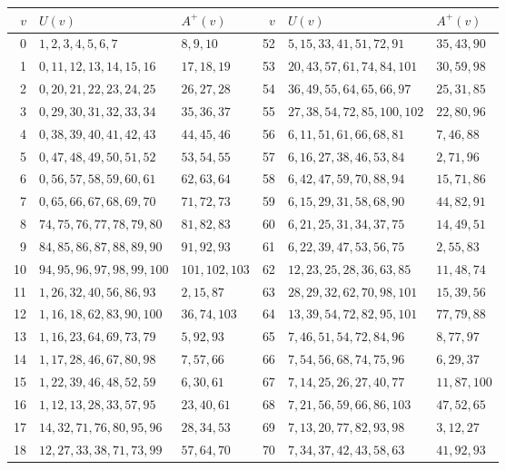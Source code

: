 \documentclass[11pt]{amsart}
\theoremstyle{remark}
\begin{document}
\begin{center}
\fontsize{6.8}{7.15}\selectfont
\setlength{\tabcolsep}{3.2pt}
\renewcommand{\arraystretch}{0.96}
\begin{tabular}{rll@{\quad}rll}
\toprule
$v$ & $U(v)$ & $A^+(v)$ & $v$ & $U(v)$ & $A^+(v)$ \\
\midrule
0 & $1,2,3,4,5,6,7$ & $8,9,10$ & 52 & $5,15,33,41,51,72,91$ & $35,43,90$ \\
1 & $0,11,12,13,14,15,16$ & $17,18,19$ & 53 & $20,43,57,61,74,84,101$ & $30,59,98$ \\
2 & $0,20,21,22,23,24,25$ & $26,27,28$ & 54 & $36,49,55,64,65,66,97$ & $25,31,85$ \\
3 & $0,29,30,31,32,33,34$ & $35,36,37$ & 55 & $27,38,54,72,85,100,102$ & $22,80,96$ \\
4 & $0,38,39,40,41,42,43$ & $44,45,46$ & 56 & $6,11,51,61,66,68,81$ & $7,46,88$ \\
5 & $0,47,48,49,50,51,52$ & $53,54,55$ & 57 & $6,16,27,38,46,53,84$ & $2,71,96$ \\
6 & $0,56,57,58,59,60,61$ & $62,63,64$ & 58 & $6,42,47,59,70,88,94$ & $15,71,86$ \\
7 & $0,65,66,67,68,69,70$ & $71,72,73$ & 59 & $6,15,29,31,58,68,90$ & $44,82,91$ \\
8 & $74,75,76,77,78,79,80$ & $81,82,83$ & 60 & $6,21,25,31,34,37,75$ & $14,49,51$ \\
9 & $84,85,86,87,88,89,90$ & $91,92,93$ & 61 & $6,22,39,47,53,56,75$ & $2,55,83$ \\
10 & $94,95,96,97,98,99,100$ & $101,102,103$ & 62 & $12,23,25,28,36,63,85$ & $11,48,74$ \\
11 & $1,26,32,40,56,86,93$ & $2,15,87$ & 63 & $28,29,32,62,70,98,101$ & $15,39,56$ \\
12 & $1,16,18,62,83,90,100$ & $36,74,103$ & 64 & $13,39,54,72,82,95,101$ & $77,79,88$ \\
13 & $1,16,23,64,69,73,79$ & $5,92,93$ & 65 & $7,46,51,54,72,84,96$ & $8,77,97$ \\
14 & $1,17,28,46,67,80,98$ & $7,57,66$ & 66 & $7,54,56,68,74,75,96$ & $6,29,37$ \\
15 & $1,22,39,46,48,52,59$ & $6,30,61$ & 67 & $7,14,25,26,27,40,77$ & $11,87,100$ \\
16 & $1,12,13,28,33,57,95$ & $23,40,61$ & 68 & $7,21,56,59,66,86,103$ & $47,52,65$ \\
17 & $14,32,71,76,80,95,96$ & $28,34,53$ & 69 & $7,13,20,77,82,93,98$ & $3,12,27$ \\
18 & $12,27,33,38,71,73,99$ & $57,64,70$ & 70 & $7,34,37,42,43,58,63$ & $41,92,93$ \\

\end{tabular}
\end{center}
\end{document}
